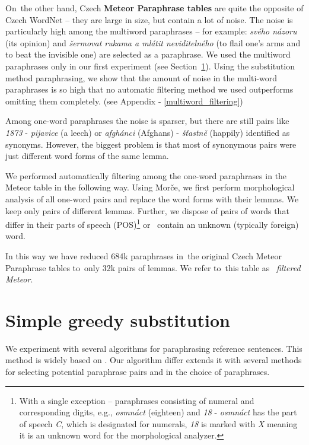 \documentclass[11pt]{article}
\def\Sref#1{Section~\ref{#1}}
\begin{document}
On~the other hand, Czech \textbf{Meteor Paraphrase tables} are quite the 
opposite of Czech WordNet -- they are large in size, but contain a lot of 
noise. The noise is particularly high among the multiword paraphrases -- for 
example: \textit{svého názoru} (its opinion) and \textit{šermovat rukama a 
mlátit neviditelného} (to flail one's arms and to beat the invisible one) are 
selected as a paraphrase. We used the multiword paraphrases only in our first 
experiment (see \Sref{lrec}). Using the substitution method paraphrasing, we 
show that the amount of noise in the multi-word paraphrases is so high that no 
automatic filtering method we used outperforms omitting them completely. (see
Appendix - \ref{multiword_filtering})
 
Among one-word paraphrases the noise is sparser, but there are still pairs like 
\textit{1873} - \textit{pijavice} (a leech) or \textit{afgh\'{a}nci} (Afghans) -
\textit{š\v{t}astně} (happily) identified as synonyms. However, the biggest 
problem is that most of synonymous pairs were just different word forms of the 
same lemma. 

We performed automatically filtering among the one-word paraphrases in the 
Meteor table in the following way. Using Morče, we first perform morphological 
analysis of all one-word pairs and replace the word forms with their lemmas. We 
keep only pairs of different lemmas. Further, we dispose of pairs of words that 
differ in their parts of speech (POS)\footnote{With a single exception -- 
paraphrases consisting of numeral and corresponding digits, e.g., 
\textit{osmnáct} (eighteen) and \textit{18} - \textit{osmnáct} has the part of 
speech \textit{C}, which is designated for numerals, \textit{18} is marked with 
\textit{X} meaning it is an unknown word for the morphological analyzer.} or
~contain an unknown (typically foreign) word.

In this way we have reduced 684k paraphrases in~the original Czech Meteor 
Paraphrase tables to~only 32k pairs of lemmas. We refer to~this table as
~\textit{filtered Meteor}.

\section{Simple greedy substitution}
\label{lrec}
We experiment with several algorithms for paraphrasing reference sentences. 
This method is widely based on \cite{kauchak}. Our algorithm differ extends it 
with several methods for selecting potential paraphrase pairs and in the choice 
of paraphrases.
\end{document}
